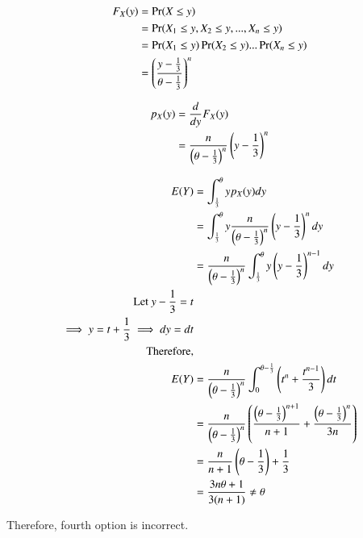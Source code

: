 \documentclass{article}[]
\begin{document}
\begin{align}
F_X(y)&=\Pr(X \leq y)\\
&=\Pr(X_1 \leq y, X_2 \leq y,..., X_n \leq y)\\
&=\Pr(X_1 \leq y)\Pr(X_2 \leq y)...\Pr(X_n \leq y)\\
&=\left(\frac{y-\frac{1}{3}}{\theta-\frac{1}{3}}\right)^n
\end{align}

\begin{align}
p_X(y)&=\frac{d}{dy} F_X(y) \\
&=\frac{n}{\left(\theta-\frac{1}{3}\right)^n} \left(y-\frac{1}{3}\right)^n 
\end{align}

\begin{align}
E(Y)&=\int_{\frac{1}{3}}^{\theta} yp_X(y) dy \\ 
&=\int_{\frac{1}{3}}^{\theta} y\frac{n}{\left(\theta-\frac{1}{3}\right)^n} \left(y-\frac{1}{3}\right)^n dy \\ 
&=\frac{n}{\left(\theta-\frac{1}{3}\right)^n}\int_{\frac{1}{3}}^{\theta} y\left(y-\frac{1}{3}\right)^{n-1} dy \\ 
\text{Let } y-\frac{1}{3}=t\\
\implies y=t+\frac{1}{3} \implies dy=dt \\
\text{Therefore,}\\
E(Y)&=\frac{n}{\left(\theta-\frac{1}{3}\right)^n}\int_{0}^{\theta-\frac{1}{3}} \left(t^n+\frac{t^{n-1}}{3}\right) dt \\
&=\frac{n}{\left(\theta-\frac{1}{3}\right)^n} \left(\frac{\left(\theta-\frac{1}{3}\right)^{n+1}}{n+1} + \frac{\left(\theta-\frac{1}{3}\right)^n}{3n}\right)\\
&=\frac{n}{n+1}\left(\theta-\frac{1}{3}\right) + \frac{1}{3}\\
&=\frac{3n\theta + 1}{3(n+1)} \neq \theta
\end{align}

Therefore, fourth option is incorrect.
\end{document}
